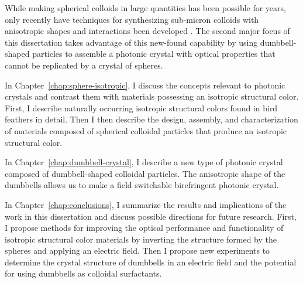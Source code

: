 While making spherical colloids in large quantities has been possible for years, only recently have techniques for synthesizing sub-micron colloids with anisotropic shapes and interactions been developed \cite{Perro2005, Jiang2008, Park2010, Duguet2011, Kuijk2011}.
The second major focus of this dissertation takes advantage of this new-found capability by using dumbbell-shaped particles to assemble a photonic crystal with optical properties that cannot be replicated by a crystal of spheres.

In Chapter~\ref{chap:sphere-isotropic}, I discuss the concepts relevant to photonic crystals and contrast them with materials possessing an isotropic structural color.
First, I describe naturally occurring isotropic structural colors found in bird feathers in detail.
Then I then describe the design, assembly, and characterization of materials composed of spherical colloidal particles that produce an isotropic structural color.

In Chapter~\ref{chap:dumbbell-crystal}, I describe a new type of photonic crystal composed of dumbbell-shaped colloidal particles.
The anisotropic shape of the dumbbells allows us to make a field switchable birefringent photonic crystal.

In Chapter~\ref{chap:conclusions}, I summarize the results and implications of the work in this dissertation and discuss possible directions for future research.
First, I propose methods for improving the optical performance and functionality of isotropic structural color materials by inverting the structure formed by the spheres and applying an electric field.
Then I propose new experiments to determine the crystal structure of dumbbells in an electric field and the potential for using dumbbells as colloidal surfactants.


